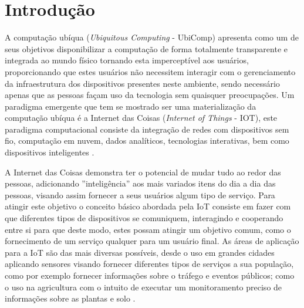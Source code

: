 \documentclass[ti,table]{texufpel} %
\begin{document}
  


\tableofcontents 

  



\chapter{Introdução} 

  

A computação ubíqua (\textit{Ubiquitous Computing} - UbiComp) apresenta como um de seus objetivos  disponibilizar a computação de forma totalmente transparente e integrada ao mundo físico tornando esta imperceptível aos usuários, proporcionando que estes usuários não necessitem interagir com o gerenciamento da infraestrutura dos dispositivos presentes neste ambiente, sendo necessário apenas que as pessoas façam uso da tecnologia sem quaisquer preocupações. Um paradigma emergente que tem se mostrado ser uma materialização da computação ubíqua é a Internet das Coisas (\textit{Internet of Things} - IOT), este paradigma computacional consiste da integração de redes com dispositivos sem fio, computação em nuvem, dados analíticos, tecnologias interativas, bem como dispositivos inteligentes \cite{weiser1999computer}.  

  

A Internet das Coisas demonstra ter o potencial de mudar tudo ao redor das pessoas, adicionando ''inteligência'' aos mais variados itens do dia a dia das pessoas, visando assim fornecer a seus usuários algum tipo de serviço. Para atingir este objetivo o conceito básico abordada pela IoT consiste em fazer com que diferentes tipos de dispositivos se comuniquem, interagindo e cooperando entre si para que deste modo, estes possam atingir um objetivo comum, como o fornecimento de um serviço qualquer para um usuário final. As áreas de aplicação para a IoT são das mais diversas possíveis, desde o uso em grandes cidades aplicando sensores visando fornecer diferentes tipos de serviços a sua população, como por exemplo fornecer informações sobre o tráfego e eventos públicos; como o uso na agricultura com o intuito de executar um monitoramento preciso de  informações sobre as plantas e solo \cite{gonccalves2017research}. 

  
\end{document}
